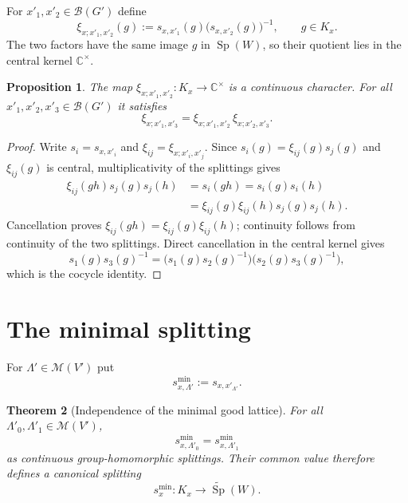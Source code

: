 \documentclass[11pt]{amsart}
\DeclareMathOperator{\Sp}{Sp}
\newtheorem{theorem}{Theorem}[section]
\newtheorem{proposition}[theorem]{Proposition}
\theoremstyle{remark}
\begin{document}
For $x'_1,x'_2\in\mathcal B(G')$ define
\begin{equation}
\xi_{x;x'_1,x'_2}(g)
:=s_{x,x'_1}(g)\bigl(s_{x,x'_2}(g)\bigr)^{-1},
\qquad g\in K_x.
\label{eq:raw-xi}
\end{equation}
The two factors have the same image $g$ in $\Sp(W)$, so their quotient lies
in the central kernel $\mathbb C^\times$.

\begin{proposition}
The map $\xi_{x;x'_1,x'_2}\colon K_x\to\mathbb C^\times$ is a continuous
character. For all $x'_1,x'_2,x'_3\in\mathcal B(G')$ it satisfies
\[
\xi_{x;x'_1,x'_3}
=\xi_{x;x'_1,x'_2}\,\xi_{x;x'_2,x'_3}.
\]
\end{proposition}

\begin{proof}
Write $s_i=s_{x,x'_i}$ and $\xi_{ij}=\xi_{x;x'_i,x'_j}$. Since
$s_i(g)=\xi_{ij}(g)s_j(g)$ and $\xi_{ij}(g)$ is central, multiplicativity of
the splittings gives
\[
\begin{aligned}
\xi_{ij}(gh)s_j(g)s_j(h)
 &=s_i(gh)=s_i(g)s_i(h)\\
 &=\xi_{ij}(g)\xi_{ij}(h)s_j(g)s_j(h).
\end{aligned}
\]
Cancellation proves $\xi_{ij}(gh)=\xi_{ij}(g)\xi_{ij}(h)$; continuity follows
from continuity of the two splittings. Direct cancellation in the central
kernel gives
\[
s_1(g)s_3(g)^{-1}
=\bigl(s_1(g)s_2(g)^{-1}\bigr)
 \bigl(s_2(g)s_3(g)^{-1}\bigr),
\]
which is the cocycle identity.
\end{proof}

\section{The minimal splitting}

For $\Lambda'\in\mathscr M(V')$ put
\[
s^{\min}_{x,\Lambda'}:=s_{x,x'_{\Lambda'}}.
\]

\begin{theorem}[Independence of the minimal good lattice]
For all $\Lambda'_0,\Lambda'_1\in\mathscr M(V')$,
\[
s^{\min}_{x,\Lambda'_0}=s^{\min}_{x,\Lambda'_1}
\]
as continuous group-homomorphic splittings. Their common value therefore
defines a canonical splitting
\[
s_x^{\min}\colon K_x\longrightarrow\widetilde{\Sp}(W).
\]
\end{theorem}
\end{document}
